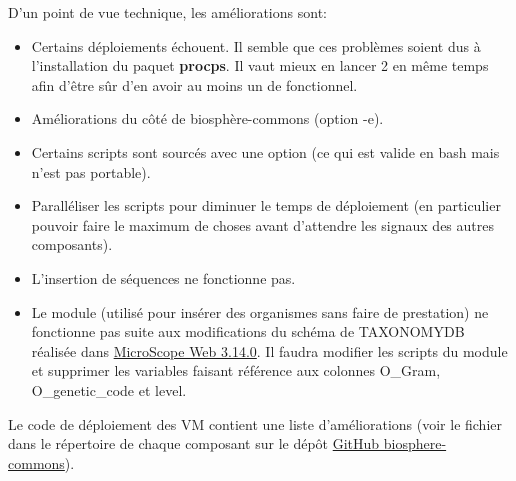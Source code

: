 D'un point de vue technique, les améliorations sont:
\begin{itemize}
	\item Certains déploiements échouent.
	      Il semble que ces problèmes soient dus à l'installation du paquet \textbf{procps}.
	      Il vaut mieux en lancer 2 en même temps afin d'être sûr d'en avoir au moins un de fonctionnel.
    \item Améliorations du côté de biosphère-commons (option -e).
    \item Certains scripts sont sourcés avec une option (ce qui est valide en bash mais n'est pas portable).
    \item Paralléliser les scripts pour diminuer le temps de déploiement (en particulier pouvoir faire le maximum de choses avant d'attendre les signaux des autres composants).
    \item L'insertion de séquences ne fonctionne pas.
    \item Le module  (utilisé pour insérer des organismes sans faire de prestation) ne fonctionne pas suite aux modifications du schéma de TAXONOMYDB réalisée dans \href{https://intranet.genoscope.cns.fr/agc/redmine/versions/142}{MicroScope Web 3.14.0}.
          Il faudra modifier les scripts du module et supprimer les variables faisant référence aux colonnes O\_Gram, O\_genetic\_code et level.
\end{itemize}

Le code de déploiement des VM contient une liste d'améliorations (voir le fichier  dans le répertoire de chaque composant sur le dépôt \href{https://github.com/IFB-ElixirFr/biosphere-commons}{GitHub biosphere-commons}).
